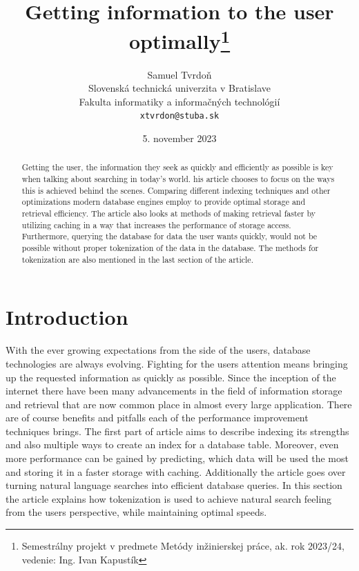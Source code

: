 \documentclass[10pt,twoside,a4paper]{article}
\title{Getting information to the user optimally\thanks{Semestrálny projekt v predmete Metódy inžinierskej práce, ak. rok 2023/24, vedenie: Ing. Ivan Kapustík}}
\author{Samuel Tvrdoň\\[2pt]
	{\small Slovenská technická univerzita v Bratislave}\\
	{\small Fakulta informatiky a informačných technológií}\\
	{\small \texttt{xtvrdon@stuba.sk}}
	}
\date{\small 5. november 2023} %
\begin{document}
\maketitle

\begin{abstract}
Getting the user, the information they seek as quickly and efficiently as possible is key when talking about searching in today’s world. his article chooses to focus on the ways this is achieved behind the scenes. Comparing different indexing techniques and other optimizations modern database engines employ to provide optimal storage and retrieval efficiency. The article also looks at methods of making retrieval faster by utilizing caching in a way that increases the performance of storage access. Furthermore, querying the database for data the user wants quickly, would not be possible without proper tokenization of the data in the database. The methods for tokenization are also mentioned in the last section of the article.
\end{abstract}

\section{Introduction}
With the ever growing expectations from the side of the users, database technologies are always evolving.\cite{Database-indexing:-yesterday-and-today} Fighting for the users attention means bringing up the requested information as quickly as possible. Since the inception of the internet there have been many advancements in the field of information storage and retrieval that are now common place in almost every large application. There are of course benefits and pitfalls each of the performance improvement techniques brings. The first part of article aims to describe indexing its strengths and also multiple ways to create an index for a database table. Moreover, even more performance can be gained by predicting, which data will be used the most and storing it in a faster storage with caching. Additionally the article goes over turning natural language searches into efficient database queries. In this section the article explains how tokenization is used to achieve natural search feeling from the users perspective, while maintaining optimal speeds.
\end{document}
